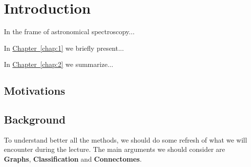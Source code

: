 \chapter{Introduction}
\lettrine[lines=2, findent=3pt, nindent=0pt]{I}{}n the frame of astronomical spectroscopy...

\bigskip
In \hyperref[chap:1]{Chapter~\ref*{chap:1}} we  briefly present...

\bigskip
In \hyperref[chap:2]{Chapter~\ref*{chap:2}} we summarize...
\section{Motivations}
\section{Background}
To understand better all the methods, we should do some refresh of what we will encounter during the lecture. The main arguments we should consider are \textbf{Graphs}, \textbf{Classification} and \textbf{Connectomes}.
